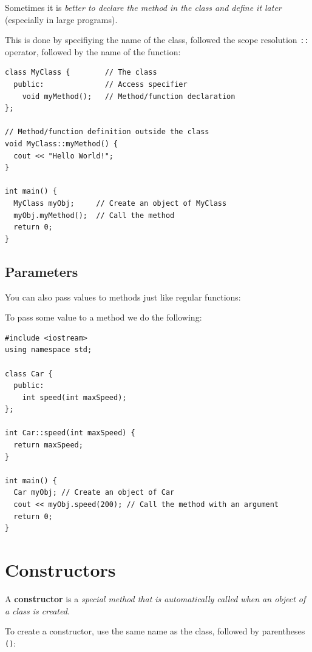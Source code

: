 \documentclass[../basic_programs.tex]{subfiles}
\begin{document}
    Sometimes it is \textit{better to declare the method in the class and define it later} (especially in large programs).

    This is done by specifiying the name of the class, followed the scope resolution \lstinline|::| operator, followed by the name of the function:

    \begin{lstlisting}[caption={caption},label=DescriptiveLabel]
class MyClass {        // The class
  public:              // Access specifier
    void myMethod();   // Method/function declaration
};

// Method/function definition outside the class
void MyClass::myMethod() {
  cout << "Hello World!";
}

int main() {
  MyClass myObj;     // Create an object of MyClass
  myObj.myMethod();  // Call the method
  return 0;
}
    \end{lstlisting}

    \subsection{Parameters}

    You can also pass values to methods just like regular functions:

    \begin{exa}
        To pass some value to a method we do the following:

        \begin{lstlisting}[caption={caption},label=DescriptiveLabel]
#include <iostream>
using namespace std;

class Car {
  public:
    int speed(int maxSpeed);
};

int Car::speed(int maxSpeed) {
  return maxSpeed;
}

int main() {
  Car myObj; // Create an object of Car
  cout << myObj.speed(200); // Call the method with an argument
  return 0;
}
        \end{lstlisting}
    \end{exa}

    \section{Constructors}

    \begin{mydef}
        A \textbf{constructor} is a \textit{special method that is automatically called when an object of a class is created}.

        To create a constructor, use the same name as the class, followed by parentheses \lstinline|()|:
    \end{mydef}
\end{document}
